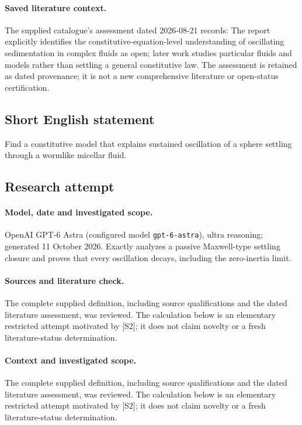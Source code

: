 \documentclass[11pt]{article}
\begin{document}
\paragraph{Saved literature context.} The supplied catalogue's assessment dated 2026-08-21 records: The report explicitly identifies the constitutive-equation-level understanding of oscillating sedimentation in complex fluids as open; later work studies particular fluids and models rather than settling a general constitutive law. The assessment is retained as dated provenance; it is not a new comprehensive literature or open-status certification.
\subsection{Short English statement}
Find a constitutive model that explains sustained oscillation of a sphere settling through a wormlike micellar fluid.
\subsection{Research attempt}
\paragraph{Model, date and investigated scope.}
OpenAI GPT-6 Astra (configured model \texttt{gpt-6-astra}), ultra reasoning; generated 11 October 2026. Exactly analyzes a passive Maxwell-type settling closure and proves that every oscillation decays, including the zero-inertia limit.

\paragraph{Sources and literature check.}
The complete supplied definition, including source qualifications and the dated literature assessment, was reviewed. The calculation below is an elementary restricted attempt motivated by [S2]; it does not claim novelty or a fresh literature-status determination.

\paragraph{Context and investigated scope.} The complete supplied definition, including source qualifications and the dated literature assessment, was reviewed. The calculation below is an elementary restricted attempt motivated by [S2]; it does not claim novelty or a fresh literature-status determination.
\end{document}
